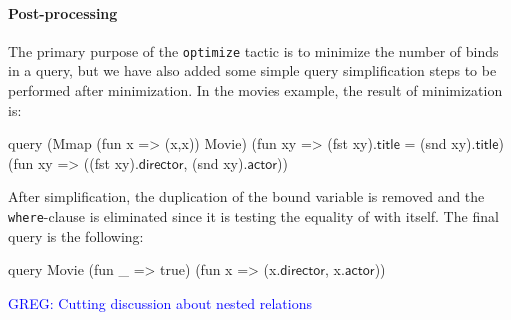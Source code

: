 \documentclass[preprint]{sigplanconf}
\newcommand{\greg}[1]{\textcolor{blue}{GREG: #1}}
\newcommand{\ltac}[0]{\ensuremath{\mathcal{L}_{\mathrm{tac}}}}
\begin{document}
\paragraph{Post-processing}
The primary purpose of the {\tt optimize} tactic is to minimize the number of binds in a query, but we have also added some simple query simplification steps to be performed after minimization.  In the movies example, the result of minimization is:
\begin{coq}
query (Mmap (fun x => (x,x)) Movie)
      (fun xy => (fst xy).$\textsf{title}$ = (snd xy).$\textsf{title}$)
      (fun xy => ((fst xy).$\textsf{director}$, (snd xy).$\textsf{actor}$))
\end{coq}
After simplification, the duplication of the bound variable is removed and the {\tt where}-clause is eliminated since it is testing the equality of  with itself.  The final query is the following:
\begin{coq}
query Movie (fun _ => true) (fun x => (x.$\textsf{director}$, x.$\textsf{actor}$))
\end{coq}

\greg{Cutting discussion about nested relations}

\end{document}
